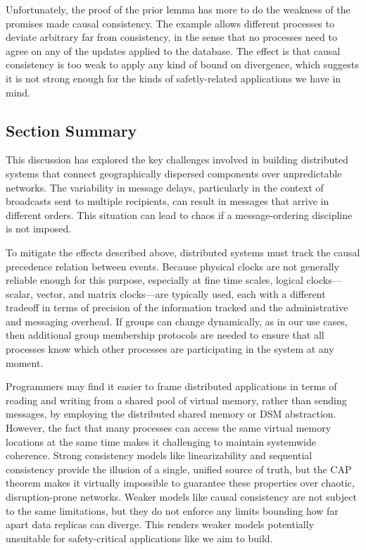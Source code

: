 \documentclass[]             %
{NASA}                       %
\theoremstyle{definition}
\begin{document}
Unfortunately, the proof of the prior lemma has more to do the
weakness of the promises made causal consistency. The example allows
different processes to deviate arbitrary far from consistency, in the
sense that no processes need to agree on any of the updates applied to
the database. The effect is that causal consistency is too weak to
apply any kind of bound on divergence, which suggests it is not strong
enough for the kinds of safetly-related applications we have in mind.

\subsection{Section Summary}
\label{ssec:background-summary}
This discussion has explored the key challenges involved in building
distributed systems that connect geographically dispersed components
over unpredictable networks. The variability in message delays,
particularly in the context of broadcasts sent to multiple recipients,
can result in messages that arrive in different orders.  This
situation can lead to chaos if a message-ordering discipline is not
imposed.

To mitigate the effects described above, distributed systems must
track the causal precedence relation between events. Because physical
clocks are not generally reliable enough for this purpose, especially
at fine time scales, logical clocks---scalar, vector, and matrix
clocks---are typically used, each with a different tradeoff in terms
of precision of the information tracked and the administrative and
messaging overhead. If groups can change dynamically, as in our use
cases, then additional group membership protocols are needed to ensure
that all processes know which other processes are participating in the
system at any moment.

Programmers may find it easier to frame distributed applications in
terms of reading and writing from a shared pool of virtual memory,
rather than sending messages, by employing the distributed shared
memory or DSM abstraction. However, the fact that many processes can
access the same virtual memory locations at the same time makes it
challenging to maintain systemwide coherence. Strong consistency
models like linearizability and sequential consistency provide the
illusion of a single, unified source of truth, but the CAP theorem
makes it virtually impossible to guarantee these properties over
chaotic, disruption-prone networks. Weaker models like causal
consistency are not subject to the same limitations, but they do not
enforce any limits bounding how far apart data replicas can
diverge. This renders weaker models potentially unsuitable for
safety-critical applications like we aim to build.
\end{document}
